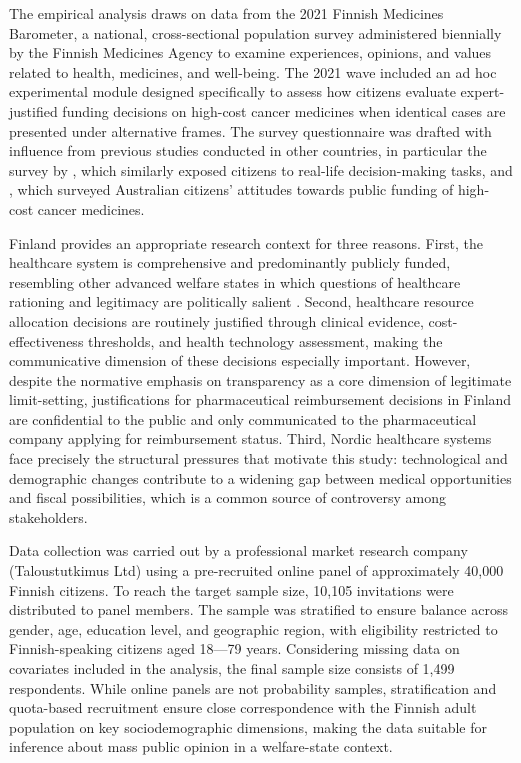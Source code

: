 \documentclass[11pt]{article}\usepackage[]{graphicx}\usepackage[]{xcolor}
\begin{document}
The empirical analysis draws on data from the 2021 Finnish Medicines Barometer, a national, cross-sectional population survey administered biennially by the Finnish Medicines Agency to examine experiences, opinions, and values related to health, medicines, and well-being. The 2021 wave included an ad hoc experimental module designed specifically to assess how citizens evaluate expert-justified funding decisions on high-cost cancer medicines when identical cases are presented under alternative frames. The survey questionnaire was drafted with influence from previous studies conducted in other countries, in particular the survey by \textcite{Blendon2012}, which similarly exposed citizens to real-life decision-making tasks, and \textcite{Ghinea2021}, which surveyed Australian citizens' attitudes towards public funding of high-cost cancer medicines.

Finland provides an appropriate research context for three reasons. First, the healthcare system is comprehensive and predominantly publicly funded, resembling other advanced welfare states in which questions of healthcare rationing and legitimacy are politically salient \parencite{Keskimaki2019FinlandHiT}. Second, healthcare resource allocation decisions are routinely justified through clinical evidence, cost-effectiveness thresholds, and health technology assessment, making the communicative dimension of these decisions especially important. However, despite the normative emphasis on transparency as a core dimension of legitimate limit-setting, justifications for pharmaceutical reimbursement decisions in Finland are confidential to the public and only communicated to the pharmaceutical company applying for reimbursement status. Third, Nordic healthcare systems face precisely the structural pressures that motivate this study: technological and demographic changes contribute to a widening gap between medical opportunities and fiscal possibilities, which is a common source of controversy among stakeholders.

Data collection was carried out by a professional market research company (Taloustutkimus Ltd) using a pre-recruited online panel of approximately 40,000 Finnish citizens. To reach the target sample size, 10,105 invitations were distributed to panel members. The sample was stratified to ensure balance across gender, age, education level, and geographic region, with eligibility restricted to Finnish-speaking citizens aged 18---79 years. Considering missing data on covariates included in the analysis, the final sample size consists of 1,499 respondents. While online panels are not probability samples, stratification and quota-based recruitment ensure close correspondence with the Finnish adult population on key sociodemographic dimensions, making the data suitable for inference about mass public opinion in a welfare-state context.
\end{document}
